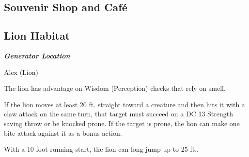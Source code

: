 \subsection*{ Souvenir Shop and Café}

\subsection*{ Lion Habitat}
\textbf{\textit{Generator Location}}\\
\begin{DndMonster}[width=0.5\textwidth - 4pt]{Alex (Lion)}

	\DndMonsterBasics[
		armor-class = {15 (Natural Armor)},
		hit-points  = {\DndDice{8d10 + 8}},
		speed       = {50 ft.},
	]

	\renewcommand{\AbilityScoreSpacer}{~}

	\DndMonsterAbilityScores[
		str = 17,
		dex = 15,
		con = 13,
		int = 3,
		wis = 12,
		cha = 8,
	]

	\DndMonsterDetails[
		skills = {Perception +3, Stealth +6},
		senses = {passive Perception 13},
		languages = {Common},
		challenge = 3,
	]

	The lion has advantage on Wisdom (Perception) checks that rely on smell.
	
	If the lion moves at least 20 ft. straight toward a creature and then hits it with a claw attack on the same turn, that target must succeed on a DC 13 Strength saving throw or be knocked prone. If the target is prone, the lion can make one bite attack against it as a bonus action.
	
	With a 10-foot running start, the lion can long jump up to 25 ft..
	

	\DndMonsterAttack[
		name=Bite,
		distance=melee, %
		mod=+5,
		reach=5,
		targets=one target,
		dmg={\DndDice{1d8 + 3}},
		dmg-type=piercing,
	]
	
	\DndMonsterAttack[
		name=Claw,
		distance=melee, %
		mod=+8,
		reach=5,
		targets=one target,
		dmg={\DndDice{1d6 + 3}},
		dmg-type=slashing,
	]
\end{DndMonster}

